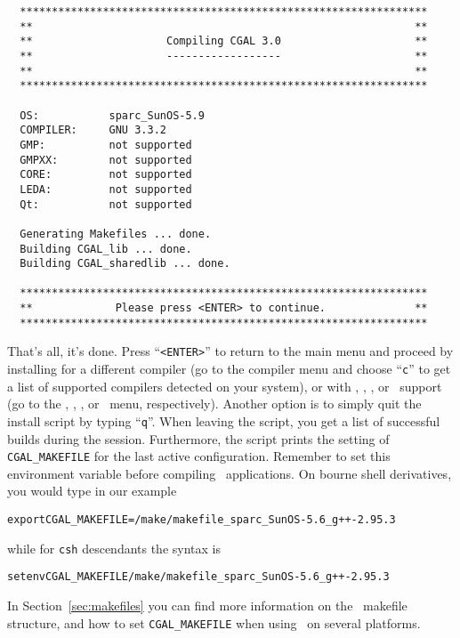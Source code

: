 {\ccTexHtml{\scriptsize}{}
\begin{verbatim}
  ****************************************************************
  **                                                            **
  **                     Compiling CGAL 3.0                     **
  **                     ------------------                     **
  **                                                            **
  ****************************************************************

  OS:           sparc_SunOS-5.9
  COMPILER:     GNU 3.3.2
  GMP:          not supported
  GMPXX:        not supported
  CORE:         not supported
  LEDA:         not supported
  Qt:           not supported

  Generating Makefiles ... done.
  Building CGAL_lib ... done.
  Building CGAL_sharedlib ... done.

  ****************************************************************
  **             Please press <ENTER> to continue.              **
  ****************************************************************
\end{verbatim}}
{
}  

That's all, it's done. Press ``\texttt{<ENTER>}'' to return to the
main menu and proceed by installing for a different compiler (go to
the compiler menu and choose ``\texttt{c}'' to get a list of supported
compilers detected on your system), or with \gmp, \core, \leda, or
\qt\ support (go to the \gmp, \core, \leda, or \qt\ menu,
respectively). Another option is to simply quit the install script by
typing ``\texttt{q}''. When leaving the script, you get a list of
successful builds during the session.  Furthermore, the script prints
the setting of \texttt{CGAL\_MAKEFILE} for the last active
configuration. Remember to set this environment variable before
compiling \cgal\ applications.  On bourne shell derivatives, you would
type in our example
\begin{alltt}
      export CGAL_MAKEFILE=\cgaldir/make/makefile_sparc_SunOS-5.6_g++-2.95.3
\end{alltt}
while for \texttt{csh} descendants the syntax is
\begin{alltt}
      setenv CGAL_MAKEFILE \cgaldir/make/makefile_sparc_SunOS-5.6_g++-2.95.3
\end{alltt}
In Section~\ref{sec:makefiles} you can find more information on the
\cgal\ makefile structure, and how to set \texttt{CGAL\_MAKEFILE} when
using \cgal\ on several platforms.

